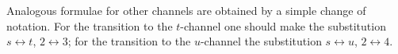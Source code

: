 Analogous formulae for other channels are obtained by a simple change of notation. For the transition to the $t$-channel one should make the substitution $s \leftrightarrow t$, $2 \leftrightarrow 3$; for the transition to the $u$-channel the substitution $s \leftrightarrow u$, $2 \leftrightarrow 4$.
